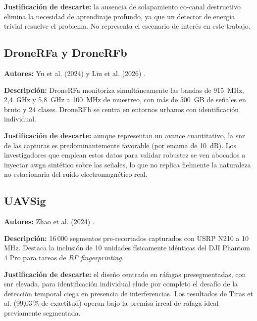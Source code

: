 \textbf{Justificación de descarte:} la ausencia de solapamiento co-canal destructivo
elimina la necesidad de aprendizaje profundo, ya que un detector de energía trivial
resuelve el problema. No representa el escenario de interés en este trabajo.

\subsection{DroneRFa y DroneRFb}
\label{subsec:dronerf_ab}

\textbf{Autores:} Yu et al. (2024) y Liu et al. (2026) \cite{yu_open_2024, liu_method_2026}.

\textbf{Descripción:} DroneRFa monitoriza simultáneamente las bandas de 915\, MHz,
2,4\, GHz y 5,8\, GHz a 100\, MHz de muestreo, con más de 500\, GB de señales en bruto
y 24 clases. DroneRFb se centra en entornos urbanos con identificación individual.

\textbf{Justificación de descarte:} aunque representan un avance cuantitativo, la
\gls{snr} de las capturas es predominantemente favorable (por encima de 10\, dB). Los
investigadores que emplean estos datos para validar robustez se ven abocados a
inyectar \gls{awgn} sintético sobre las señales, lo que no replica fielmente la
naturaleza no estacionaria del ruido electromagnético real.

\subsection{UAVSig}
\label{subsec:uavsig}

\textbf{Autores:} Zhao et al. (2024) \cite{zhao_drone_2024}.

\textbf{Descripción:} 16\,000 segmentos pre-recortados capturados con USRP N210 a
10\, MHz. Destaca la inclusión de 10 unidades físicamente idénticas del DJI Phantom 4
Pro para tareas de \textit{RF fingerprinting}.

\textbf{Justificación de descarte:} el diseño centrado en ráfagas presegmentadas,
con \gls{snr} elevada, para identificación individual elude por completo el desafío
de la detección temporal ciega en presencia de interferencias. Los resultados de
Tiras et al. \cite{tiras_crossrf_2025} (99,03\,\% de exactitud) operan bajo la
premisa irreal de ráfaga ideal previamente segmentada.

